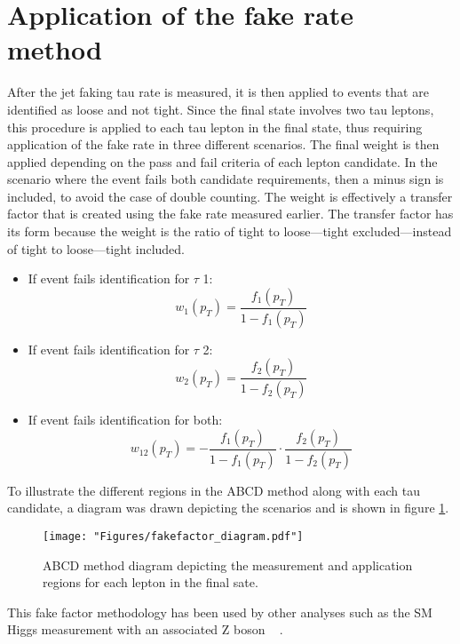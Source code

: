\clearpage

\section{Application of the fake rate method}

After the jet faking tau rate is measured, it is then applied to events that are identified as loose and not tight. Since the final state involves two tau leptons, this procedure is applied to each tau lepton in the final state, thus requiring application of the fake rate in three different scenarios. The final weight is then applied depending on the pass and fail criteria of each lepton candidate. In the scenario where the event fails both candidate requirements, then a minus sign is included, to avoid the case of double counting.  
 The weight is effectively a transfer factor that is created using the fake rate measured earlier. The transfer factor has its form because the weight is the ratio of tight to loose---tight excluded---instead of tight to loose---tight included. 
\begin{itemize}
\item{If event fails identification for $\tau$ 1:\begin{equation}\label{eq:frw} w_1(p_T)=\frac{f_{1}(p_T)}{1-f_{1}(p_T)}\end{equation}}
\item{If event fails identification for $\tau$ 2:\begin{equation}w_2(p_T)=\frac{f_{2}(p_T)}{1-f_{2}(p_T)}\end{equation}}
\item{If event fails identification for both:\begin{equation}w_{12}(p_T)=-\frac{f_{1}(p_T)}{1-f_{1}(p_T)}\cdot\frac{f_{2}(p_T)}{1-f_{2}(p_T)}\end{equation}}
\end{itemize}

To illustrate the different regions in the ABCD method along with each tau candidate, a diagram was drawn depicting the scenarios and is shown in figure \ref{fig:fakefactor_reg}. 
\begin{figure}[ht!b]
\label{fig:fakefactor_reg}
  \texttt{[image: "Figures/fakefactor\_diagram.pdf"]}
    \caption{ ABCD method diagram depicting the measurement and application regions for each \tauh lepton in the final sate.}
\end{figure}

This fake factor methodology has been used by other analyses such as the SM Higgs measurement with an associated Z boson ~\cite{CMS-PAS-HIG-19-010} . 

